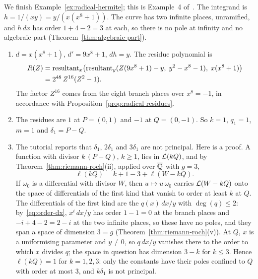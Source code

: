 \begin{example}\label{ex:radical-log}
We finish Example~\ref{ex:radical-hermite}; this is Example~4
of~\cite{bronstein1998tutorial}. The integrand is $h = 1/(xy) = y/(x (x^8 +
1))$. The curve has two infinite places, unramified, and $h\,dx$ has order
$1 + 4 - 2 = 3$ at each, so there is no pole at infinity and no algebraic
part (Theorem~\ref{thm:algebraic-part}).
\begin{enumerate}
\item $d = x (x^8 + 1)$, $d' = 9x^8 + 1$, $dh = y$. The residue polynomial is
  \begin{align*}
    R(Z) &= \operatorname{resultant}_x\bigl( \operatorname{resultant}_y( Z (9x^8 + 1) - y,\; y^2 - x^8 - 1 ),\;
           x (x^8 + 1) \bigr) \\
         &= 2^{48}\, Z^{16} (Z^2 - 1) .
  \end{align*}
  The factor $Z^{16}$ comes from the eight branch places over $x^8 = -1$, in
  accordance with Proposition~\ref{prop:radical-residues}.
\item The residues are $1$ at $P = (0, 1)$ and $-1$ at $Q = (0, -1)$. So $k
  = 1$, $q_1 = 1$, $m = 1$ and $\delta_1 = P - Q$.
\item The tutorial reports that $\delta_1$, $2\delta_1$ and $3\delta_1$ are
  not principal. Here is a proof. A function with divisor $k\,(P - Q)$, $k \ge
  1$, lies in $\mathcal{L}(kQ)$, and by Theorem~\ref{thm:riemann-roch}(ii), applied
  over $\overline{\mathbb{Q}}$ with $g = 3$,
  \[
    \ell(kQ) = k + 1 - 3 + \ell(W - kQ) .
  \]
  If $\omega_0$ is a differential with divisor $W$, then $u \mapsto u\,
  \omega_0$ carries $\mathcal{L}(W - kQ)$ onto the space of differentials of the
  first kind that vanish to order at least $k$ at $Q$. The differentials of
  the first kind are the $q(x)\,dx/y$ with $\deg(q) \le 2$:
  by~\eqref{eq:order-dx}, $x^i\,dx/y$ has order $1 - 1 = 0$ at the branch
  places and $-i + 4 - 2 = 2 - i$ at the two infinite places, so these have
  no poles, and they span a space of dimension $3 = g$
  (Theorem~\ref{thm:riemann-roch}(v)). At $Q$, $x$ is a uniformising
  parameter and $y \ne 0$, so $q\,dx/y$ vanishes there to the order to which
  $x$ divides $q$; the space in question has dimension $3 - k$ for $k \le 3$.
  Hence $\ell(kQ) = 1$ for $k = 1, 2, 3$: only the constants have their poles
  confined to $Q$ with order at most $3$, and $k \delta_1$ is not principal.


\end{enumerate}
\end{example}
